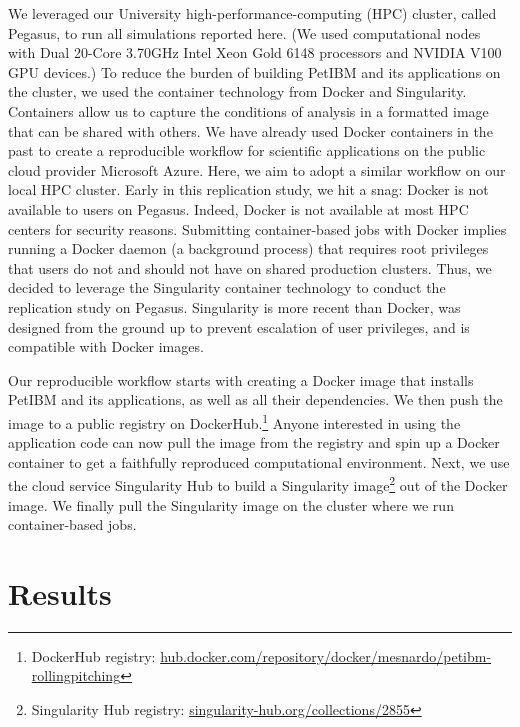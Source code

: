 We leveraged our University high-performance-computing (HPC) cluster, called Pegasus, to run all simulations reported here.
(We used computational nodes with Dual 20-Core 3.70GHz Intel Xeon Gold 6148 processors and NVIDIA V100 GPU devices.)
To reduce the burden of building PetIBM and its applications on the cluster, we used the container technology from Docker\supercite{merkel_2014} and Singularity.\supercite{kurtzer_et_al_2017}
Containers allow us to capture the conditions of analysis in a formatted image that can be shared with others.
We have already used Docker containers in the past to create a reproducible workflow for scientific applications on the public cloud provider Microsoft Azure.\supercite{mesnard_barba_2020}
Here, we aim to adopt a similar workflow on our local HPC cluster.
Early in this replication study, we hit a snag: Docker is not available to users on Pegasus.
Indeed, Docker is not available at most HPC centers for security reasons.
Submitting container-based jobs with Docker implies running a Docker daemon (a background process) that requires root privileges that users do not and should not have on shared production clusters.
Thus, we decided to leverage the Singularity container technology to conduct the replication study on Pegasus.
Singularity is more recent than Docker, was designed from the ground up to prevent escalation of user privileges, and is compatible with Docker images.

Our reproducible workflow starts with creating a Docker image that installs PetIBM and its applications, as well as all their dependencies.
We then push the image to a public registry on DockerHub.\footnote{DockerHub registry: \url{hub.docker.com/repository/docker/mesnardo/petibm-rollingpitching}}
Anyone interested in using the application code can now pull the image from the registry and spin up a Docker container to get a faithfully reproduced computational environment.
Next, we use the cloud service Singularity Hub to build a Singularity image\footnote{Singularity Hub registry: \url{singularity-hub.org/collections/2855}} out of the Docker image.
We finally pull the Singularity image on the cluster where we run container-based jobs.

\section{Results}

